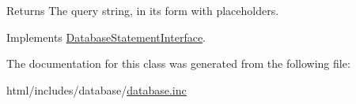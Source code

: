 \begin{DoxyReturn}{Returns}
The query string, in its form with placeholders. 
\end{DoxyReturn}


Implements \hyperlink{interfaceDatabaseStatementInterface_a2c248a565c623713d8e5ddf0ba83880d}{DatabaseStatementInterface}.

The documentation for this class was generated from the following file:\begin{DoxyCompactItemize}
\item 
html/includes/database/\hyperlink{database_8inc}{database.inc}\end{DoxyCompactItemize}
